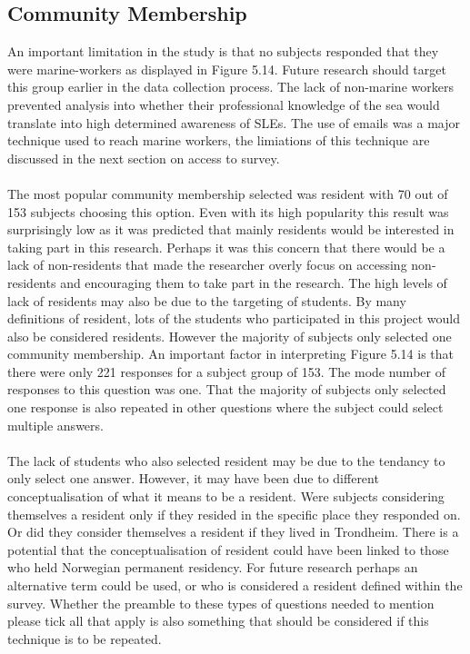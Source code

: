 \paragraph{}


\subsection{Community Membership}
An important limitation in the study is that no subjects responded that they were marine-workers as displayed in Figure 5.14. Future research should target this group earlier in the data collection process. The lack of non-marine workers prevented analysis into whether their professional knowledge of the sea would translate into high determined awareness of SLEs. The use of emails was a major technique used to reach marine workers, the limiations of this technique are discussed in the next section on access to survey. 

\paragraph{}
The most popular community membership selected was resident with 70 out of 153 subjects choosing this option. Even with its high popularity this result was  surprisingly low as it was predicted that mainly residents would be interested in taking part in this research. Perhaps it was this concern that there would be a lack of non-residents that made the researcher overly focus on accessing non-residents and encouraging them to take part in the research. The high levels of lack of residents may also be due to the targeting of students. By many definitions of resident, lots of the students who participated in this project would also be considered residents. However the majority of subjects only selected one community membership. An important factor in interpreting Figure 5.14 is that there were only 221 responses for a subject group of 153. The mode number of responses to this question was one. That the majority of subjects only selected one response is also repeated in other questions where the subject could select multiple answers. 
\paragraph{}
The lack of students who also selected resident may be due to the tendancy to only select one answer. However, it may have been due to different conceptualisation of what it means to be a resident. Were subjects considering themselves a resident only if they resided in the specific place they responded on. Or did they consider themselves a resident if they lived in Trondheim. There is a potential that the conceptualisation of resident could have been linked to those who held Norwegian permanent residency. For future research perhaps an alternative term could be used, or who is considered a resident defined within the survey. Whether the preamble to these types of questions needed to mention please tick all that apply is also something that should be considered if this technique is to be repeated. 
